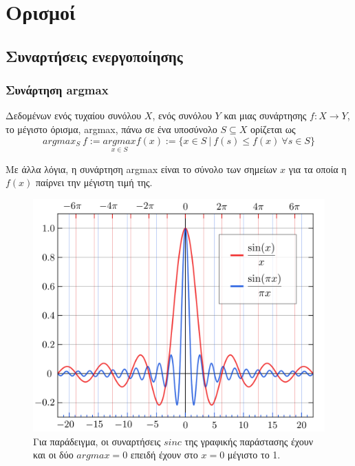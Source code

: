 \section{Ορισμοί}
\newtheorem{definition}{Ορισμός}
\label{appendix:math_definitions}

\subsection{Συναρτήσεις ενεργοποίησης}
\subsubsection{Συνάρτηση argmax}
\label{definition:argmax}
Δεδομένων ενός τυχαίου συνόλου \(X\), ενός συνόλου \(Y\) και μιας συνάρτησης \(f: X\rightarrow Y\), το μέγιστο όρισμα, argmax, πάνω σε ένα υποσύνολο \(S \subseteq X\) ορίζεται ως
\[argmax_{S} \: f := \underset{x \in S}{argmax} f(x) := \{x \in S \: | \: f(s) \leq f(x)  \: \forall s \in S\} \]


Με άλλα λόγια, η συνάρτηση argmax είναι το σύνολο των σημείων \(x\) για τα οποία η \(f(x)\) παίρνει την μέγιστη τιμή της.

\begin{figure}[h]
	\centering
	\includegraphics[scale=0.2]{images/appendix/function_argmax_example.png}
	\caption[Παράδειγμα συνάρτησης argmax]{Για παράδειγμα, οι συναρτήσεις \(sinc\) της γραφικής παράστασης έχουν και οι δύο \(argmax = 0\) επειδή έχουν στο \(x = 0\) μέγιστο το 1. }
\end{figure}



